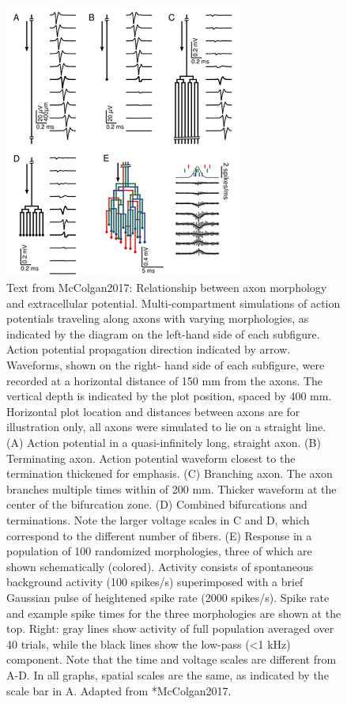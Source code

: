\begin{figure}[!ht]
\begin{center}
\includegraphics[width=0.7\textwidth]{Figures/Spikes/Spikes-AxonalSpikes-w100-r150}
\end{center}
\caption[]{
Text from McColgan2017: Relationship between axon morphology and extracellular potential. Multi-compartment simulations of action potentials traveling along axons with varying morphologies, as indicated by the diagram on the left-hand side of each subfigure. Action potential propagation direction indicated by arrow. Waveforms, shown on the right- hand side of each subfigure, were recorded at a horizontal distance of 150 mm from the axons. The vertical depth is indicated by the plot position, spaced by 400 mm. Horizontal plot location and distances between axons are for illustration only, all axons were simulated to lie on a straight line. (A) Action potential in a quasi-infinitely long, straight axon. (B) Terminating axon. Action potential waveform closest to the termination thickened for emphasis. (C) Branching axon. The axon branches multiple times within of 200 mm. Thicker waveform at the center of the bifurcation zone. (D) Combined bifurcations and terminations. Note the larger voltage scales in C and D, which correspond to the different number of fibers. (E) Response in a population of 100 randomized morphologies, three of which are shown schematically (colored). Activity consists of spontaneous background activity (100 spikes/s) superimposed with a brief Gaussian pulse of heightened spike rate (2000 spikes/s). Spike rate and example spike times for the three morphologies are shown at the top. Right: gray lines show activity of full population averaged over 40 trials, while the black lines show the low-pass (<1 kHz) component. Note that the time and voltage scales are different from A-D. In all graphs, spatial scales are the same, as indicated by the scale bar in A. 
 Adapted from \citeasnoun**{McColgan2017}.
}
\label{fig:Spikes:AxonalSpikes}
\end{figure}
%


